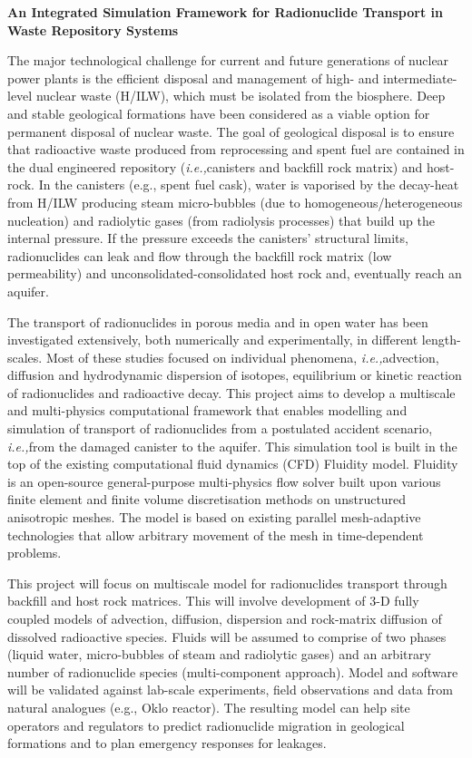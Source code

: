 \documentclass[14pt,twoside]{report}
\newcommand{\ie}{{\it i.e.,}}
\begin{document}
\begin{center}
   \large{\bf An Integrated Simulation Framework for Radionuclide Transport in Waste Repository Systems}
\end{center}

The major technological challenge for current and future generations of nuclear power plants is the efficient disposal and management of high- and intermediate-level nuclear waste (H/ILW), which must be isolated from the biosphere. Deep and stable geological formations have been considered as a viable option for permanent disposal of nuclear waste. The goal of geological disposal is to ensure that radioactive waste produced from reprocessing and spent fuel are contained in the dual engineered repository (\ie canisters and backfill rock matrix) and host-rock. In the canisters (e.g., spent fuel cask), water is vaporised by the decay-heat from H/ILW producing steam micro-bubbles (due to homogeneous/heterogeneous nucleation) and radiolytic gases (from radiolysis processes) that build up the internal pressure. If the pressure exceeds the canisters' structural limits, radionuclides can leak and flow through the backfill rock matrix (low permeability) and unconsolidated-consolidated host rock and, eventually reach an aquifer.

The transport of radionuclides in porous media and in open water has been investigated extensively, both numerically and experimentally, in different length-scales. Most of these studies focused on individual phenomena, \ie advection, diffusion and hydrodynamic dispersion of isotopes, equilibrium or kinetic reaction of radionuclides and radioactive decay. This project aims to develop a multiscale and multi-physics computational framework that enables modelling and simulation of transport of radionuclides from a postulated accident scenario, \ie from the damaged canister to the aquifer. This simulation tool is built in the top of the existing computational fluid dynamics (CFD) Fluidity model.  Fluidity is an open-source general-purpose multi-physics flow solver built upon various finite element and finite volume discretisation methods on unstructured anisotropic meshes. The model is based on existing parallel mesh-adaptive technologies that allow arbitrary movement of the mesh in time-dependent problems.

This project will focus on multiscale model for radionuclides transport through backfill and host rock matrices. This will involve development of 3-D fully coupled models of advection, diffusion, dispersion and rock-matrix diffusion of dissolved radioactive species. Fluids will be assumed to comprise of two phases (liquid water, micro-bubbles of steam and radiolytic gases) and an arbitrary number of radionuclide species (multi-component approach). Model and software will be validated against lab-scale experiments, field observations and data from natural analogues (e.g., Oklo reactor).  The resulting model can help site operators and regulators to predict radionuclide migration in geological formations and to plan emergency responses for leakages.
\end{document}
